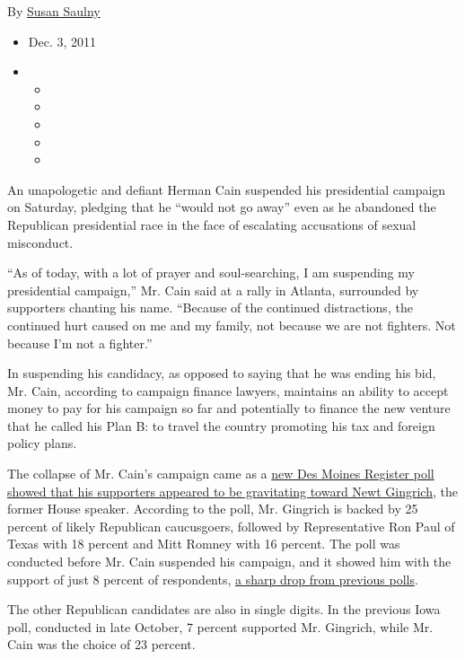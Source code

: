 By \href{https://www.nytimes.com/by/susan-saulny}{Susan Saulny}

\begin{itemize}
\item
  Dec. 3, 2011
\item
  \begin{itemize}
  \item
  \item
  \item
  \item
  \item
  \end{itemize}
\end{itemize}

An unapologetic and defiant Herman Cain suspended his presidential
campaign on Saturday, pledging that he ``would not go away'' even as he
abandoned the Republican presidential race in the face of escalating
accusations of sexual misconduct.

``As of today, with a lot of prayer and soul-searching, I am suspending
my presidential campaign,'' Mr. Cain said at a rally in Atlanta,
surrounded by supporters chanting his name. ``Because of the continued
distractions, the continued hurt caused on me and my family, not because
we are not fighters. Not because I'm not a fighter.''

In suspending his candidacy, as opposed to saying that he was ending his
bid, Mr. Cain, according to campaign finance lawyers, maintains an
ability to accept money to pay for his campaign so far and potentially
to finance the new venture that he called his Plan B: to travel the
country promoting his tax and foreign policy plans.

The collapse of Mr. Cain's campaign came as a
\href{http://caucuses.desmoinesregister.com/2011/12/03/iowa-poll-gingrich-leading-the-pack/}{new
Des Moines Register poll showed that his supporters appeared to be
gravitating toward Newt Gingrich}, the former House speaker. According
to the poll, Mr. Gingrich is backed by 25 percent of likely Republican
caucusgoers, followed by Representative Ron Paul of Texas with 18
percent and Mitt Romney with 16 percent. The poll was conducted before
Mr. Cain suspended his campaign, and it showed him with the support of
just 8 percent of respondents,
\href{http://www.nytimes.com/interactive/2011/11/30/us/politics/ups-and-downs-of-the-cain-candidacy.html}{a
sharp drop from previous polls}.

The other Republican candidates are also in single digits. In the
previous Iowa poll, conducted in late October, 7 percent supported Mr.
Gingrich, while Mr. Cain was the choice of 23 percent.

